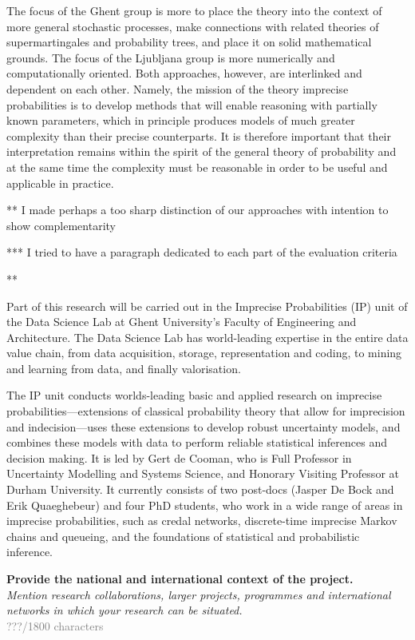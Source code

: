 \documentclass[11pt,dvipsnames,usenames,a4paper]{article}
\begin{document}
The focus of the Ghent group is more to place the theory into the context of more general stochastic processes, make connections with related theories of supermartingales and probability trees, and place it on solid mathematical grounds. The focus of the Ljubljana group is more numerically and computationally oriented. Both approaches, however, are interlinked and dependent on each other. Namely, the mission of the theory imprecise probabilities is to develop methods that will enable reasoning with partially known parameters, which in principle produces models of much greater complexity than their precise counterparts. It is therefore important that their interpretation remains within the spirit of the general theory of probability and at the same time the complexity must be reasonable in order to be useful and applicable in practice. 


** I made perhaps a too sharp distinction of our approaches with intention to show complementarity  

*** I tried to have a paragraph dedicated to each part of the evaluation criteria

**

Part of this research will be carried out in the Imprecise Probabilities (IP) unit of the Data Science Lab at Ghent University's Faculty of Engineering and Architecture.
The Data Science Lab has world-leading expertise in the entire data value chain, from data acquisition, storage, representation and coding, to mining and learning from data, and finally valorisation. 

The IP unit conducts worlds-leading basic and applied research on imprecise probabilities---extensions of classical probability theory that allow for imprecision and indecision---uses these extensions to develop robust uncertainty models, and combines these models with data to perform reliable statistical inferences and decision making.
It is led by Gert de Cooman, who is Full Professor in Uncertainty Modelling and Systems Science, and Honorary Visiting Professor at Durham University.
It currently consists of two post-docs (Jasper De Bock and Erik Quaeghebeur) and four PhD students, who work in a wide range of areas in imprecise probabilities, such as credal networks, discrete-time imprecise Markov chains and queueing, and the foundations of statistical and probabilistic inference.  


\textbf{Provide the national and international context of the project.}\\
\textit{Mention research collaborations, larger projects, programmes and international networks in which your research can be situated.}\\
\textcolor{Gray}{???/1800 characters}
\end{document}
